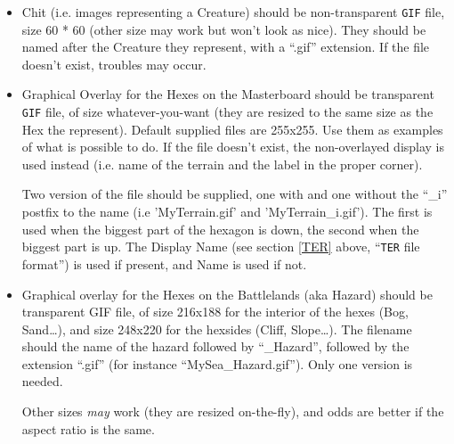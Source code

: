 \documentclass{article}
\begin{document}
\begin{itemize}
\item Chit (i.e. images representing a Creature) should be non-transparent \texttt{GIF} file, size 60 * 60 (other size may work but won't look as nice). They should be named after the Creature they represent, with a ``.gif'' extension. If the file doesn't exist, troubles may occur.

\item Graphical Overlay for the Hexes on the Masterboard should be transparent \texttt{GIF} file, of size whatever-you-want (they are resized to the same size as the Hex the represent). Default supplied files are 255x255. Use them as examples of what is possible to do. If the file doesn't exist, the non-overlayed display is used instead (i.e. name of the terrain and the label in the proper corner).

Two version of the file should be supplied, one with and one without the ``\_i'' postfix to the name (i.e 'MyTerrain.gif' and 'MyTerrain\_i.gif'). The first is used when the biggest part of the hexagon is down, the second when the biggest part is up. The Display Name (see section \ref{TER} above, ``\texttt{TER} file format'') is used if present, and Name is used if not.

\item Graphical overlay for the Hexes on the Battlelands (aka Hazard) should be transparent GIF file, of size 216x188 for the interior of the hexes (Bog, Sand\ldots), and size 248x220 for the hexsides (Cliff, Slope\ldots). The filename should the name of the hazard followed by ``\_Hazard'', followed by the extension ``.gif'' (for instance ``MySea\_Hazard.gif''). Only one version is needed.

Other sizes \emph{may} work (they are resized on-the-fly), and odds are better if the aspect ratio is the same.
\end{itemize}
\end{document}
